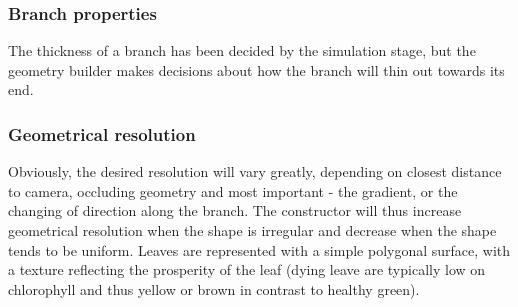 \subsubsection{Branch properties}
The thickness of a branch has been decided by the simulation stage, but the
geometry builder makes decisions about how the branch will thin out towards its
end.

\subsubsection{Geometrical resolution}
Obviously, the desired
resolution will vary greatly, depending on closest distance to camera, occluding
geometry and most important - the gradient, or the changing of direction along 
the branch. The constructor will thus increase geometrical resolution when the 
shape is irregular and decrease when the shape tends to be uniform. Leaves are
represented with a simple polygonal surface, with a texture reflecting the
prosperity of the leaf (dying leave are typically low on chlorophyll and thus
yellow or brown in contrast to healthy green).

